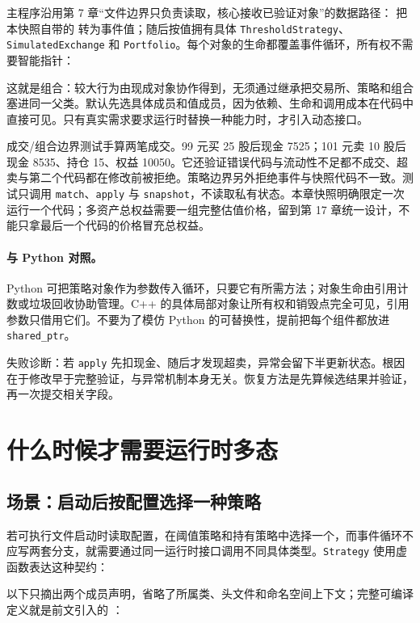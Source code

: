 主程序沿用第 7 章“文件边界只负责读取，核心接收已验证对象”的数据路径： 把本快照自带的  转为事件值；随后按值拥有具体 \texttt{ThresholdStrategy}、\texttt{SimulatedExchange} 和 \texttt{Portfolio}。每个对象的生命都覆盖事件循环，所有权不需要智能指针：



这就是组合：较大行为由现成对象协作得到，无须通过继承把交易所、策略和组合塞进同一父类。默认先选具体成员和值成员，因为依赖、生命和调用成本在代码中直接可见。只有真实需求要求运行时替换一种能力时，才引入动态接口。

成交/组合边界测试手算两笔成交。99 元买 25 股后现金 7525；101 元卖 10 股后现金 8535、持仓 15、权益 10050。它还验证错误代码与流动性不足都不成交、超卖与第二个代码都在修改前被拒绝。策略边界另外拒绝事件与快照代码不一致。测试只调用 \texttt{match}、\texttt{apply} 与 \texttt{snapshot}，不读取私有状态。本章快照明确限定一次运行一个代码；多资产总权益需要一组完整估值价格，留到第 17 章统一设计，不能只拿最后一个代码的价格冒充总权益。

\paragraph{与 Python 对照。}
Python 可把策略对象作为参数传入循环，只要它有所需方法；对象生命由引用计数或垃圾回收协助管理。C++ 的具体局部对象让所有权和销毁点完全可见，引用参数只借用它们。不要为了模仿 Python 的可替换性，提前把每个组件都放进 \texttt{shared\_ptr}。

失败诊断：若 \texttt{apply} 先扣现金、随后才发现超卖，异常会留下半更新状态。根因在于修改早于完整验证，与异常机制本身无关。恢复方法是先算候选结果并验证，再一次提交相关字段。

\section{什么时候才需要运行时多态}

\subsection{场景：启动后按配置选择一种策略}

若可执行文件启动时读取配置，在阈值策略和持有策略中选择一个，而事件循环不应写两套分支，就需要通过同一运行时接口调用不同具体类型。\texttt{Strategy} 使用虚函数表达这种契约：

以下只摘出两个成员声明，省略了所属类、头文件和命名空间上下文；完整可编译定义就是前文引入的 ：

